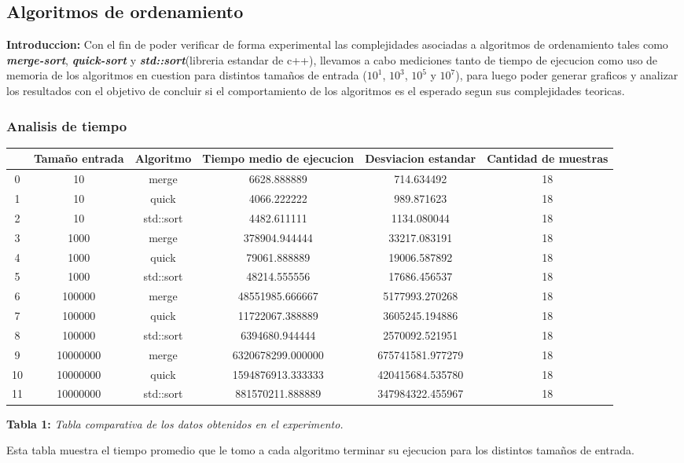 \documentclass[11pt,spanish]{article} %
\begin{document}
\subsection{Algoritmos de ordenamiento}
\textbf{Introduccion:} Con el fin de poder verificar de forma experimental las complejidades asociadas a algoritmos de 
ordenamiento tales como \textbf{\textit{merge-sort}}, \textbf{\textit{quick-sort}} y 
\textbf{\textit{std::sort}}(libreria estandar de c++), llevamos a cabo mediciones tanto de tiempo de ejecucion como uso 
de memoria de los algoritmos en cuestion para distintos tamaños de entrada ($10^{1}$, $10^{3}$, $10^{5}$ y $10^{7}$), 
para luego poder generar graficos y analizar los resultados con el objetivo de concluir si el comportamiento de los 
algoritmos es el esperado segun sus complejidades teoricas.
\subsubsection{Analisis de tiempo}

\begin{table}[h]
  \small
  \begin{tabular}{|c|c|c|c|c|c|}
    \hline
    & Tamaño entrada & Algoritmo & Tiempo medio de ejecucion & Desviacion estandar & Cantidad de muestras \\
    \hline
    0 & 10 & merge & 6628.888889 & 714.634492 & 18 \\
    1 & 10 & quick & 4066.222222 & 989.871623 & 18 \\
    2 & 10 & std::sort & 4482.611111 & 1134.080044 & 18 \\
    \hline
    3 & 1000 & merge & 378904.944444 & 33217.083191 & 18 \\
    4 & 1000 & quick & 79061.888889 & 19006.587892 & 18 \\
    5 & 1000 & std::sort & 48214.555556 & 17686.456537 & 18 \\
    \hline
    6 & 100000 & merge & 48551985.666667 & 5177993.270268 & 18 \\
    7 & 100000 & quick & 11722067.388889 & 3605245.194886 & 18 \\
    8 & 100000 & std::sort & 6394680.944444 & 2570092.521951 & 18 \\
    \hline
    9 & 10000000 & merge & 6320678299.000000 & 675741581.977279 & 18 \\
    10 & 10000000 & quick & 1594876913.333333 & 420415684.535780 & 18 \\
    11 & 10000000 & std::sort & 881570211.888889 & 347984322.455967 & 18 \\
    \hline
  \end{tabular}
\end{table}
\begin{center}
  \textbf{Tabla 1:} \textit{Tabla comparativa de los datos obtenidos en el experimento.}
\end{center}
Esta tabla muestra el tiempo promedio que le tomo a cada algoritmo terminar su ejecucion para los distintos tamaños de 
entrada.
\clearpage
\end{document}
